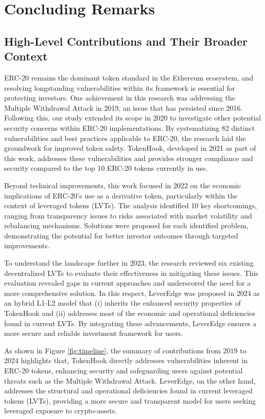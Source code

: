 
\chapter{Concluding Remarks}\label{ch:remarks}
\section{High-Level Contributions and Their Broader Context}
ERC-20 remains the dominant token standard in the Ethereum ecosystem, and resolving longstanding vulnerabilities within its framework is essential for protecting investors. One achievement in this research was addressing the Multiple Withdrawal Attack in 2019, an issue that has persisted since 2016. Following this, our study extended its scope in 2020 to investigate other potential security concerns within ERC-20 implementations. By systematizing 82 distinct vulnerabilities and best practices applicable to ERC-20, the research laid the groundwork for improved token safety. TokenHook, developed in 2021 as part of this work, addresses these vulnerabilities and provides stronger compliance and security compared to the top 10 ERC-20 tokens currently in use.

Beyond technical improvements, this work focused in 2022 on the economic implications of ERC-20's use as a derivative token, particularly within the context of leveraged tokens (LVTs). The analysis identified 10 key shortcomings, ranging from transparency issues to risks associated with market volatility and rebalancing mechanisms. Solutions were proposed for each identified problem, demonstrating the potential for better investor outcomes through targeted improvements.

To understand the landscape further in 2023, the research reviewed six existing decentralized LVTs to evaluate their effectiveness in mitigating these issues. This evaluation revealed gaps in current approaches and underscored the need for a more comprehensive solution. In this respect, LeverEdge was proposed in 2024 as an hybrid L1-L2 model that (i) inherits the enhanced security properties of TokenHook and (ii) addresses most of the economic and operational deficiencies found in current LVTs. By integrating these advancements, LeverEdge ensures a more secure and reliable investment framework for users.

As shown in Figure \ref{fig:timeline}, the summary of contributions from 2019 to 2024 highlights that, TokenHook directly addresses vulnerabilities inherent in ERC-20 tokens, enhancing security and safeguarding users against potential threats such as the Multiple Withdrawal Attack. LeverEdge, on the other hand, addresses the structural and operational deficiencies found in current leveraged tokens (LVTs), providing a more secure and transparent model for users seeking leveraged exposure to crypto-assets.

